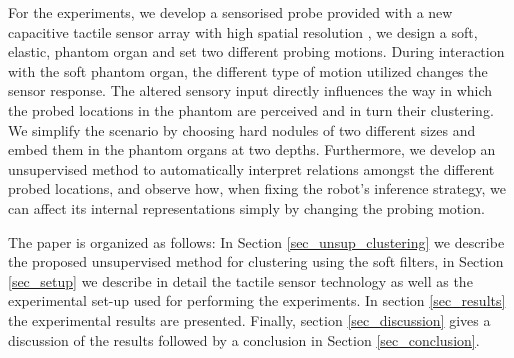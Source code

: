 \documentclass[]{interact}
\theoremstyle{plain}%
\theoremstyle{definition}
\theoremstyle{remark}
\begin{document}
For the experiments, we develop a sensorised probe provided with a new capacitive tactile sensor array with high spatial resolution \cite{schmitz_methods_2011}, we design a soft, elastic, phantom organ and set two different probing motions. 
During interaction with the soft phantom organ, the different type of motion utilized changes the sensor response. The altered sensory input directly influences the way in which the probed locations in the phantom are perceived and in turn their clustering. We simplify the scenario by choosing hard nodules of two different sizes and embed them in the phantom organs at two depths. Furthermore, we develop an unsupervised method to automatically interpret relations amongst the different probed locations, and observe how, when fixing the robot's inference strategy, we can affect its internal representations simply by changing the probing motion.


The paper is organized as follows: In Section \ref{sec_unsup_clustering} we describe the proposed unsupervised method for clustering using the soft filters, in Section \ref{sec_setup} we describe in detail the tactile sensor technology as well as the experimental set-up used for performing the experiments. In section \ref{sec_results} the experimental results are presented. Finally, section \ref{sec_discussion} gives a discussion of the results followed by a conclusion in Section \ref{sec_conclusion}.

\end{document}
